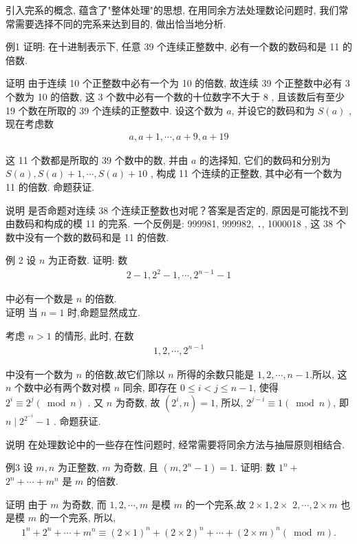	引入完系的概念, 蕴含了"整体处理"的思想, 在用同余方法处理数论问题时, 我们常常需要选择不同的完系来达到目的, 做出恰当地分析.

	例1 证明: 在十进制表示下, 任意 39 个连续正整数中, 必有一个数的数码和是 11 的倍数.

	证明 由于连续 10 个正整数中必有一个为 10 的倍数, 故连续 39 个正整数中必有 3 个数为 10 的倍数, 这 3 个数中必有一个数的十位数字不大于 8 , 且该数后有至少 19 个数在所取的 39 个连续的正整数中. 设这个数为 $a$, 并设它的数码和为 $S(a)$ , 现在考虑数
	\begin{align*}
		a, a+1, \cdots, a+9, a+19
	\end{align*}

	这 11 个数都是所取的 39 个数中的数, 并由 $a$ 的选择知, 它们的数码和分别为 $S(a), S(a)+1, \cdots, S(a)+10$ , 构成 11 个连续的正整数, 其中必有一个数为 11 的倍数. 命题获证.

	说明 是否命题对连续 38 个连续正整数也对呢？答案是否定的, 原因是可能找不到由数码和构成的模 11 的完系. 一个反例是: 999981, 999982, ․, 1000018 , 这 38 个数中没有一个数的数码和是 11 的倍数.

	例 2 设 $n$ 为正奇数. 证明: 数
	\begin{align*}
		2-1,2^{2}-1, \cdots, 2^{n-1}-1
	\end{align*}

	中必有一个数是 $n$ 的倍数. \\
	证明 当 $n=1$ 时,命题显然成立.

	考虑 $n>1$ 的情形, 此时, 在数
	\begin{align*}
		1,2, \cdots, 2^{n-1}
	\end{align*}

	中没有一个数为 $n$ 的倍数,故它们除以 $n$ 所得的余数只能是 $1,2, \cdots, n-1$.所以, 这 $n$ 个数中必有两个数对模 $n$ 同余, 即存在 $0 \leqslant i<j \leqslant n-1$, 使得 $2^{i} \equiv 2^{j}(\bmod n)$ . 又 $n$ 为奇数, 故 $\left(2^{i}, n\right)=1$, 所以, $2^{j-i} \equiv 1(\bmod n)$, 即 $n \mid 2^{2^{-i}}-1$ . 命题获证.

	说明 在处理数论中的一些存在性问题时, 经常需要将同余方法与抽屉原则相结合.

	例3 设 $m ,  n$ 为正整数, $m$ 为奇数, 且 $\left(m, 2^{n}-1\right)=1$. 证明: 数 $1^{n}+$ $2^{n}+\cdots+m^{n}$ 是 $m$ 的倍数.

	证明 由于 $m$ 为奇数, 而 $1,2, \cdots, m$ 是模 $m$ 的一个完系,故 $2 \times 1,2 \times$ $2, \cdots, 2 \times m$ 也是模 $m$ 的一个完系, 所以,
	\begin{align*}
		1^{n}+2^{n}+\boldsymbol{\cdots}+m^{n} \equiv(2 \times 1)^{n}+(2 \times 2)^{n}+\boldsymbol{\cdots}+(2 \times m)^{n}(\bmod m) .
	\end{align*}

